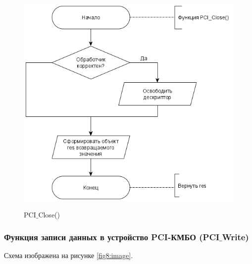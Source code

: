 	\begin{figure}[ph!]
		\centering
		\begin{center}
			{\includegraphics[scale=0.5]{schemes/pci_close.png}}
			\caption{PCI$\_$Close()}
			\label{fig7:image}
		\end{center}
	\end{figure}

	\newpage
	\subsubsection{Функция записи данных в устройство PCI-КМБО (PCI$\_$Write)}

	Схема изображена на рисунке \ref{fig8:image}.
	
